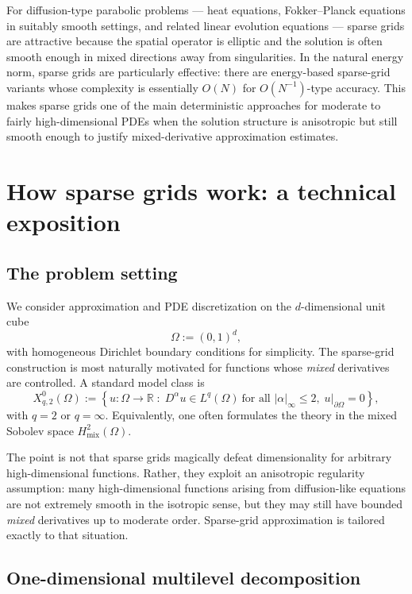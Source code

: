 \documentclass[11pt,a4paper]{report}
\begin{document}
For diffusion-type parabolic problems --- heat equations, Fokker--Planck equations in suitably smooth settings, and related linear evolution equations --- sparse grids are attractive because the spatial operator is elliptic and the solution is often smooth enough in mixed directions away from singularities. In the natural energy norm, sparse grids are particularly effective: there are energy-based sparse-grid variants whose complexity is essentially $O(N)$ for $O(N^{-1})$-type accuracy. This makes sparse grids one of the main deterministic approaches for moderate to fairly high-dimensional PDEs when the solution structure is anisotropic but still smooth enough to justify mixed-derivative approximation estimates.

\chapter{How sparse grids work: a technical exposition}

\section{The problem setting}

We consider approximation and PDE discretization on the $d$-dimensional unit cube
$$
\Omega := (0,1)^d,
$$
with homogeneous Dirichlet boundary conditions for simplicity. The sparse-grid construction is most naturally motivated for functions whose \emph{mixed} derivatives are controlled. A standard model class is
$$
X^{0}_{q,2}(\Omega)
:=
\left\{
u:\Omega\to\mathbb{R}\;:\;
D^\alpha u \in L^q(\Omega)\ \text{for all } |\alpha|_\infty\le 2,\;
u|_{\partial\Omega}=0
\right\},
$$
with $q=2$ or $q=\infty$. Equivalently, one often formulates the theory in the mixed Sobolev space $H^2_{\mathrm{mix}}(\Omega)$.

The point is not that sparse grids magically defeat dimensionality for arbitrary high-dimensional functions. Rather, they exploit an anisotropic regularity assumption: many high-dimensional functions arising from diffusion-like equations are not extremely smooth in the isotropic sense, but they may still have bounded \emph{mixed} derivatives up to moderate order. Sparse-grid approximation is tailored exactly to that situation.

\section{One-dimensional multilevel decomposition}
\end{document}
